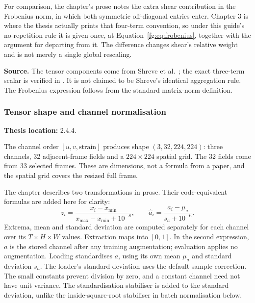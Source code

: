 \documentclass[11pt,a4paper]{article}
\numberwithin{equation}{section}
\begin{document}
For comparison, the chapter's prose notes the extra shear contribution in the
Frobenius norm, in which both symmetric off-diagonal entries enter. Chapter 3
is where the thesis actually prints that four-term convention, so under this
guide's no-repetition rule it is given once, at
Equation~\eqref{fg:eq:frobenius}, together with the argument for departing
from it. The difference changes shear's relative weight and is not merely a
single global rescaling.

\textbf{Source.} The tensor components come from Shreve
et al.~\cite{shreve2011}; the exact three-term scalar is verified in
.
It is not claimed to be Shreve's identical aggregation rule. The Frobenius
expression follows from the standard matrix-norm definition.

\subsubsection{Tensor shape and channel normalisation}
\label{fg:tensor}
\textbf{Thesis location:} 2.4.4.

The channel order $[u,v,\mathrm{strain}]$ produces shape $(3,32,224,224)$:
three channels, 32 adjacent-frame fields and a $224\times224$ spatial grid.
The 32 fields come from 33 selected frames. These are dimensions, not a
formula from a paper, and the spatial grid covers the resized full frame.

\label{fg:input-normalisation}
The chapter describes two transformations in prose. Their code-equivalent
formulas are added here for clarity:
\begin{equation}
    z_i=\frac{x_i-x_{\min}}{x_{\max}-x_{\min}+10^{-8}},
    \qquad
    \widehat a_i=\frac{a_i-\mu_a}{s_a+10^{-6}}.
    \label{fg:eq:input-normalisation}
\end{equation}
Extrema, mean and standard deviation are computed separately for each channel
over its $T\times H\times W$ values. Extraction maps into $[0,1]$.
In the second expression, $a$ is the stored channel after any training
augmentation; evaluation applies no augmentation. Loading standardises $a$,
using its own mean $\mu_a$ and standard deviation $s_a$. The loader's standard
deviation uses the default sample correction. The small constants prevent
division by zero, and a constant channel need not have unit variance. The
standardisation stabiliser is added to the standard deviation, unlike the
inside-square-root stabiliser in batch normalisation below.
\end{document}
